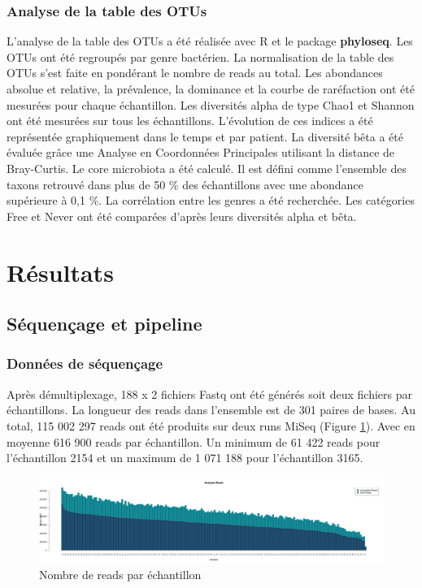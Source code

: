 \documentclass[12pt,a4paper]{article}
\begin{document}
\subsubsection{Analyse de la table des OTUs}
L’analyse de la table des OTUs a été réalisée avec R et le package \textbf{phyloseq}\cite{McMurdie2013}. Les OTUs ont été regroupés par genre bactérien. La normalisation de la table des OTUs s'est faite en pondérant le nombre de reads au total.
Les abondances absolue et relative, la prévalence, la dominance et la courbe de raréfaction ont été mesurées pour chaque échantillon.
Les diversités alpha de type Chao1 et Shannon ont été mesurées sur tous les échantillons. L'évolution de ces indices a été représentée graphiquement dans le temps et par patient.
La diversité bêta a été évaluée grâce une Analyse en Coordonnées Principales utilisant la distance de Bray-Curtis.
Le core microbiota\cite{VanderGast2011} a été calculé. Il est défini comme l’ensemble des taxons retrouvé dans plus de 50 \% des échantillons avec une abondance supérieure à 0,1 \%.
La corrélation entre les genres a été recherchée.
Les catégories Free et Never ont été comparées d’après leurs diversités alpha et bêta.



\section{Résultats}
\subsection{Séquençage et pipeline}
\subsubsection{Données de séquençage}
Après démultiplexage, 188 x 2 fichiers Fastq ont été générés soit deux fichiers par échantillons.
La longueur des reads dans l'ensemble est de 301 paires de bases.
Au total, 115 002 297 reads ont été produits sur deux runs MiSeq (Figure \ref{readcount}). Avec en moyenne 616 900 reads par échantillon. Un minimum de 61 422 reads pour l’échantillon 2154 et un maximum de 1 071 188 pour l’échantillon 3165.


\begin{figure}[ht]
\begin{center}
\includegraphics[scale=0.25]{img/pipeline.png}\hfill
\end{center}
\caption{Nombre de reads par échantillon}
\label{readcount}
\end{figure}
\end{document}
